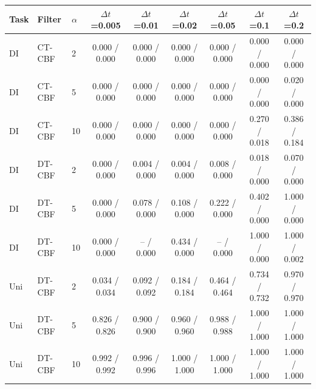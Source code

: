 \begin{tabular}{lllcccccc}
\hline
Task & Filter & $\alpha$ & $\Delta t$=0.005 & $\Delta t$=0.01 & $\Delta t$=0.02 & $\Delta t$=0.05 & $\Delta t$=0.1 & $\Delta t$=0.2 \\
\hline
DI & CT-CBF & 2 & 0.000 / 0.000 & 0.000 / 0.000 & 0.000 / 0.000 & 0.000 / 0.000 & 0.000 / 0.000 & 0.000 / 0.000 \\
DI & CT-CBF & 5 & 0.000 / 0.000 & 0.000 / 0.000 & 0.000 / 0.000 & 0.000 / 0.000 & 0.000 / 0.000 & 0.020 / 0.000 \\
DI & CT-CBF & 10 & 0.000 / 0.000 & 0.000 / 0.000 & 0.000 / 0.000 & 0.000 / 0.000 & 0.270 / 0.018 & 0.386 / 0.184 \\
\hline
DI & DT-CBF & 2 & 0.000 / 0.000 & 0.004 / 0.000 & 0.004 / 0.000 & 0.008 / 0.000 & 0.018 / 0.000 & 0.070 / 0.000 \\
DI & DT-CBF & 5 & 0.000 / 0.000 & 0.078 / 0.000 & 0.108 / 0.000 & 0.222 / 0.000 & 0.402 / 0.000 & 1.000 / 0.000 \\
DI & DT-CBF & 10 & 0.000 / 0.000 & -- / 0.000 & 0.434 / 0.000 & -- / 0.000 & 1.000 / 0.000 & 1.000 / 0.002 \\
\hline
Uni & DT-CBF & 2 & 0.034 / 0.034 & 0.092 / 0.092 & 0.184 / 0.184 & 0.464 / 0.464 & 0.734 / 0.732 & 0.970 / 0.970 \\
Uni & DT-CBF & 5 & 0.826 / 0.826 & 0.900 / 0.900 & 0.960 / 0.960 & 0.988 / 0.988 & 1.000 / 1.000 & 1.000 / 1.000 \\
Uni & DT-CBF & 10 & 0.992 / 0.992 & 0.996 / 0.996 & 1.000 / 1.000 & 1.000 / 1.000 & 1.000 / 1.000 & 1.000 / 1.000 \\
\hline
\end{tabular}
